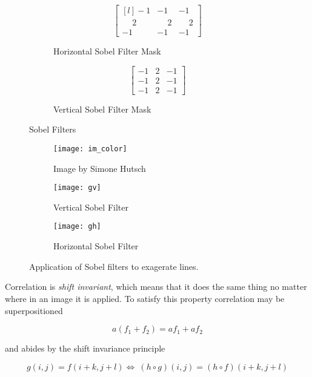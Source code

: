 \begin{figure}[H]
  \begin{subfigure}[b]{0.49\textwidth}
    \[
    \begin{bmatrix*}[l]
     -1 & -1 & -1 \\
      \phantom{-}2 & \phantom{-}2 & \phantom{-}2 \\
      -1 & -1 & -1 
    \end{bmatrix*}
    \]
    \caption{Horizontal Sobel Filter Mask}
    \label{rfidtest_xaxis}
\end{subfigure}
\begin{subfigure}[b]{0.49\textwidth}
  \[ 
    \begin{bmatrix}
      -1 & 2 & -1 \\
      -1 & 2 & -1 \\
      -1 & 2 & -1
    \end{bmatrix}
    \]
    \caption{Vertical Sobel Filter Mask}  
\end{subfigure}
    \caption{Sobel Filters}
    \label{fig:sobel_filters}
\end{figure}

\begin{figure}[H]
  \centering
  \begin{subfigure}[b]{0.3\textwidth}
      \texttt{[image: im\_color]}
      \caption{Image by Simone Hutsch}
  \end{subfigure}
  \begin{subfigure}[b]{0.3\textwidth}
      \texttt{[image: gv]}
      \caption{Vertical Sobel Filter}
      \label{fig:vert}
  \end{subfigure}
  \begin{subfigure}[b]{0.3\textwidth}
      \texttt{[image: gh]}
      \caption{Horizontal Sobel Filter}
      \label{fig:hoz}
  \end{subfigure}
  \caption{Application of Sobel filters to exagerate lines.}
  \label{fig:sobel_apply}
\end{figure}

Correlation is \emph{shift invariant}, which means that it does the same thing no matter where in an image it is applied. To satisfy this property correlation may be superpositioned 

\[a(f_1 + f_2) = af_1 + af_2\]

and abides by the shift invariance principle

\[g(i,j)=f(i+k,j+l) \Leftrightarrow\ (h\circ g)(i,j)=(h\circ f)(i+k,j+l)\]

